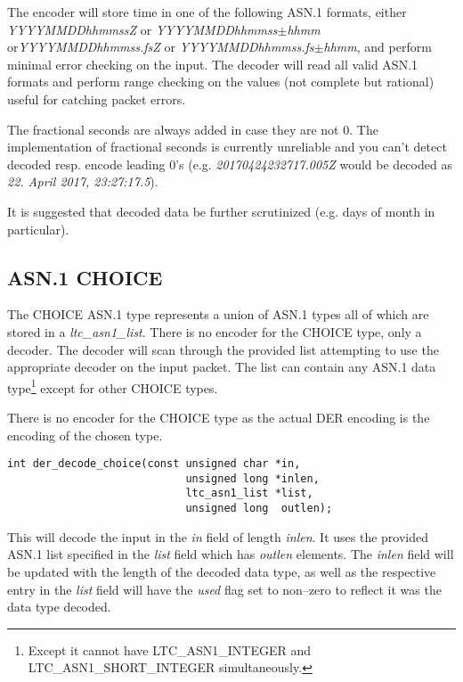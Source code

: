 \documentclass[synpaper]{book}
\begin{document}
The encoder will store time in one of the following ASN.1 formats, either \textit{YYYYMMDDhhmmssZ} or
\textit{YYYYMMDDhhmmss$\pm$hhmm} or\textit{YYYYMMDDhhmmss.fsZ} or \textit{YYYYMMDDhhmmss.fs$\pm$hhmm},
and perform minimal error checking on the input.
The decoder will read all valid ASN.1 formats and perform range checking on the values (not complete but
rational) useful for catching packet errors.

The fractional seconds are always added in case they are not $0$.
The implementation of fractional seconds is currently unreliable and you can't detect decoded
resp. encode leading $0$'s (e.g. \textit{20170424232717.005Z} would be decoded as
\textit{22. April 2017, 23:27:17.5}).

It is suggested that decoded data be further scrutinized (e.g. days of month in particular).

\subsection{ASN.1 CHOICE}

The CHOICE ASN.1 type represents a union of ASN.1 types all of which are stored in a \textit{ltc\_asn1\_list}.  There is no encoder for the CHOICE type, only a
decoder.  The decoder will scan through the provided list attempting to use the appropriate decoder on the input packet.  The list can contain any ASN.1 data
type\footnote{Except it cannot have LTC\_ASN1\_INTEGER and LTC\_ASN1\_SHORT\_INTEGER simultaneously.} except for other CHOICE types.

There is no encoder for the CHOICE type as the actual DER encoding is the encoding of the chosen type.

\begin{verbatim}
int der_decode_choice(const unsigned char *in,
                            unsigned long *inlen,
                            ltc_asn1_list *list,
                            unsigned long  outlen);
\end{verbatim}

This will decode the input in the \textit{in} field of length \textit{inlen}.  It uses the provided ASN.1 list specified in the \textit{list} field which has
\textit{outlen} elements.  The \textit{inlen} field will be updated with the length of the decoded data type, as well as the respective entry in the \textit{list} field
will have the \textit{used} flag set to non--zero to reflect it was the data type decoded.
\end{document}
